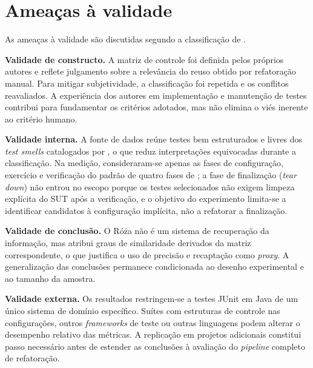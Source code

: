 \section{Ameaças à validade}

As ameaças à validade são discutidas segundo a classificação de .

\textbf{Validade de constructo.} A matriz de controle foi definida pelos próprios autores e reflete julgamento sobre a relevância do reuso obtido por refatoração manual. Para mitigar subjetividade, a classificação foi repetida e os conflitos reavaliados. A experiência dos autores em implementação e manutenção de testes contribui para fundamentar os critérios adotados, mas não elimina o viés inerente ao critério humano.

\textbf{Validade interna.} A fonte de dados reúne testes bem estruturados e livres dos \textit{test smells} catalogados por , o que reduz interpretações equivocadas durante a classificação. Na medição, consideraram-se apenas as fases de configuração, exercício e verificação do padrão de quatro fases de ; a fase de finalização (\textit{tear down}) não entrou no escopo porque os testes selecionados não exigem limpeza explícita do SUT após a verificação, e o objetivo do experimento limita-se a identificar candidatos à configuração implícita, não a refatorar a finalização.

\textbf{Validade de conclusão.} O Róża não é um sistema de recuperação da informação, mas atribui graus de similaridade derivados da matriz correspondente, o que justifica o uso de precisão e recaptação como \textit{proxy}. A generalização das conclusões permanece condicionada ao desenho experimental e ao tamanho da amostra.

\textbf{Validade externa.} Os resultados restringem-se a testes JUnit em Java de um único sistema de domínio específico. Suítes com estruturas de controle nas configurações, outros \textit{frameworks} de teste ou outras linguagens podem alterar o desempenho relativo das métricas. A replicação em projetos adicionais constitui passo necessário antes de estender as conclusões à avaliação do \textit{pipeline} completo de refatoração.
